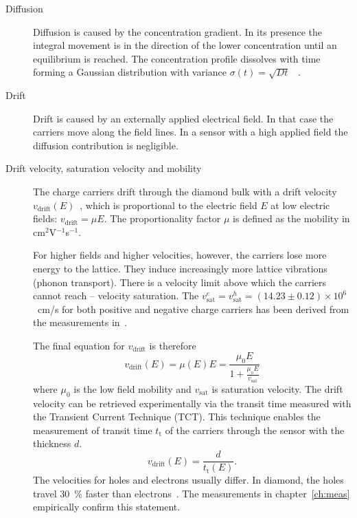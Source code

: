 \begin{description}

\item[Diffusion]
Diffusion is caused by the concentration gradient. In its presence the integral movement is in the direction of the lower concentration until an equilibrium is reached.
The concentration profile dissolves with time forming a Gaussian distribution with variance $\sigma(t)=\sqrt{Dt}$~\cite{} .

\item[Drift]
Drift is caused by an externally applied electrical field. In that case the carriers move along the field lines. In a sensor with a high applied field the diffusion contribution is negligible. 

\item[Drift velocity, saturation velocity and mobility]
The charge carriers drift through the diamond bulk with a drift velocity $v_\mathrm{drift}(E)$~\cite{}, which is proportional to the electric field $E$ at low electric fields: $v_\mathrm{drift} = \mu E$. The proportionality factor $\mu$ is defined as the mobility in cm$^2$V$^{-1}$s$^{-1}$.

For higher fields and higher velocities, however, the carriers lose more energy to the lattice. They induce increasingly more lattice vibrations (phonon transport). There is a velocity limit above which the carriers cannot reach -- velocity saturation. The $v^e_\mathrm{sat}=v^h_\mathrm{sat}=(14.23\pm0.12)\times10^6$~cm/s for both positive and negative charge carriers has been derived from the measurements in~\cite{JANSEN:00001}.

The final equation for $v_\mathrm{drift}$ is therefore
\begin{equation}
\label{eq:vsat}
v_\mathrm{drift}(E) = \mu(E)E= \frac{\mu_\mathrm{0} E}{1 + \frac{\mu_\mathrm{o} E}{v_\mathrm{sat}}}
\end{equation}
where $\mu_\mathrm{0}$ is the low field mobility and $v_\mathrm{sat}$ is saturation velocity. The drift velocity can be retrieved experimentally via the transit time measured with the Transient Current Technique (TCT). This technique enables the measurement of transit time $t_\mathrm{t}$ of the carriers through the sensor with the thickness $d$. 
\begin{equation}
\label{eq:vsat}
v_\mathrm{drift}(E) = \frac{d}{t_\mathrm{t}(E)}.
\end{equation}
The velocities for holes and electrons usually differ. In diamond, the holes travel 30~\% faster than electrons~\cite{}. The measurements in chapter~\ref{ch:meas} empirically confirm this statement.


\end{description}
